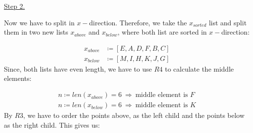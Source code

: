 \documentclass[english, fontsize=12pt, paper=a4, twoside=false, draft=true, pagesize=auto, version=last, DIV=16]{scrartcl}
\theoremstyle{break}
\begin{document}
\underline{Step 2.} \par
Now we have to split in $x-$direction. Therefore, we take the $x_{sorted}$ list and split them in two new lists $x_{above}$ and $x_{below}$, where both list are sorted in $x-$direction: \par
\vspace*{-3mm}
\begin{equation}
\begin{aligned}
x_{above} & \coloneqq [E,A,D,F,B,C] \\[3pt]
x_{below} & \coloneqq [M,I,H,K,J,G]
\end{aligned}
\end{equation}
Since, both lists have even length, we have to use $R4$ to calculate the middle elements: \par\vspace*{-3mm}
\begin{equation}
\begin{aligned}
n \coloneqq len(x_{above}) = 6 \ \Longrightarrow \ \text{middle element is } F \\[3pt]
n \coloneqq len(x_{below}) = 6 \ \Longrightarrow \ \text{middle element is } K
\end{aligned}
\end{equation}
By $R3$, we have to order the points above, as the left child and the points below as the right child. This gives us: \newpage
\end{document}
